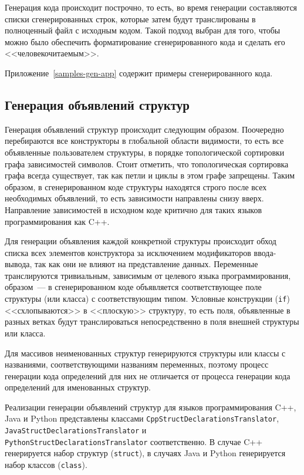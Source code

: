 \documentclass[times,specification,annotation]{style/itmo-student-thesis/itmo-student-thesis}
\begin{document}
Генерация кода происходит построчно, то есть, во время генерации составляются списки сгенерированных строк, которые затем будут транслированы в полноценный файл с исходным кодом. Такой подход выбран для того, чтобы можно было обеспечить форматирование сгенерированного кода и сделать его <<человекочитаемым>>.

Приложение~\ref{samples-gen-app} содержит примеры сгенерированного кода.

\subsection{Генерация объявлений структур}

Генерация объявлений структур происходит следующим образом. Поочередно перебираются все конструкторы в глобальной области видимости, то есть все объявленные пользователем структуры, в порядке топологической сортировки графа зависимостей символов. Стоит отметить, что топологическая сортировка графа всегда существует, так как петли и циклы в этом графе запрещены. Таким образом, в сгенерированном коде структуры находятся строго после всех необходимых объявлений, то есть зависимости направлены снизу вверх. Направление зависимостей в исходном коде критично для таких языков программирования как C++.

Для генерации объявления каждой конкретной структуры происходит обход списка всех элементов конструктора за исключением модификаторов ввода-вывода, так как они не влияют на представление данных. Переменные транслируются тривиальным, зависимым от целевого языка программирования, образом~--- в сгенерированном коде объявляется соответствующее поле структуры (или класса) с соответствующим типом. Условные конструкции (\texttt{if}) <<схлопываются>> в <<плоскую>> структуру, то есть поля, объявленные в разных ветках будут транслироваться непосредственно в поля внешней структуры или класса.

Для массивов неименованных структур генерируются структуры или классы с названиями, соответствующими названиям переменных, поэтому процесс генерации кода определений для них не отличается от процесса генерации кода определений для именованных структур.

Реализации генерации объявлений структур для языков программирования C++, Java и Python представлены классами \texttt{CppStructDeclarationsTranslator}, \texttt{JavaStructDeclarationsTranslator} и\\\texttt{PythonStructDeclarationsTranslator} соответственно. В случае C++ генерируется набор структур (\texttt{struct}), в случаях Java и Python генерируется набор классов (\texttt{class}).
\end{document}

